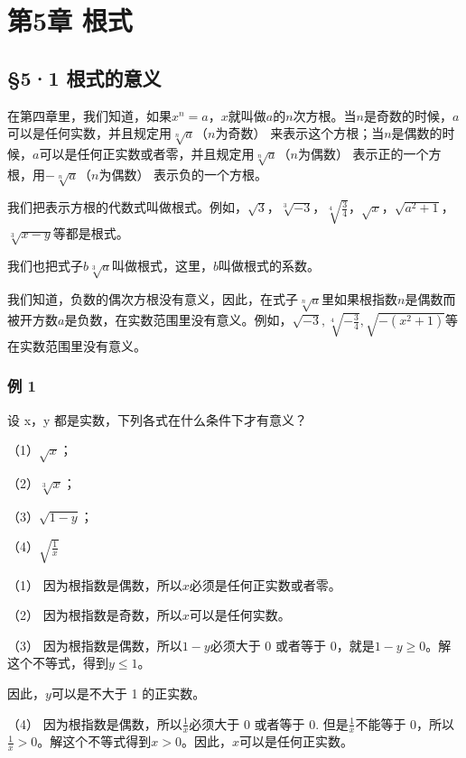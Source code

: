 \chapter{第5章 根式}

\section{§5·1 根式的意义}

在第四章里，我们知道，如果\(x^n = a\)，\(x\)就叫做\(a\)的\(n\)次方根。当\(n\)是奇数的时候，\(a\)可以是任何实数，并且规定用\(\sqrt[n]{a}\)（\(n\)为奇数）
来表示这个方根；当\(n\)是偶数的时候，\(a\)可以是任何正实数或者零，并且规定用\(\sqrt[n]{a}\)（\(n\)为偶数）
表示正的一个方根，用\(-\sqrt[n]{a}\)（\(n\)为偶数） 表示负的一个方根。

我们把表示方根的代数式叫做根式。例如，\(\sqrt{3}\)，\(\sqrt[3]{-3}\)，\(\sqrt[4]{\frac{3}{4}}\)，\(\sqrt{x}\)，\(\sqrt{a^2 + 1}\)，\(\sqrt[3]{x - y}\)等都是根式。

我们也把式子\(b\sqrt[3]{a}\)叫做根式，这里，\(b\)叫做根式的系数。

我们知道，负数的偶次方根没有意义，因此，在式子\(\sqrt[n]{a}\)里如果根指数\(n\)是偶数而被开方数\(a\)是负数，在实数范围里没有意义。例如，\(\sqrt{-3}, \sqrt[4]{-\frac{3}{4}}, \sqrt{-(x^2 + 1)}\)等在实数范围里没有意义。

\subsection{例 1}

设 x，y 都是实数，下列各式在什么条件下才有意义？

（1）\(\sqrt{x}\)；

（2）\(\sqrt[3]{x}\)；

（3）\(\sqrt{1 - y}\)；

（4）\(\sqrt{\frac{1}{x}}\)

 （1）
因为根指数是偶数，所以\(x\)必须是任何正实数或者零。

（2） 因为根指数是奇数，所以\(x\)可以是任何实数。

（3） 因为根指数是偶数，所以\(1 - y\)必须大于 0 或者等于
0，就是\(1 - y \geqslant 0\)。解这个不等式，得到\(y \leqslant 1\)。

因此，\(y\)可以是不大于 1 的正实数。

（4） 因为根指数是偶数，所以\(\frac{1}{x}\)必须大于 0 或者等于 0.
但是\(\frac{1}{x}\)不能等于
0，所以\(\frac{1}{x} > 0\)。解这个不等式得到\(x > 0\)。因此，\(x\)可以是任何正实数。


